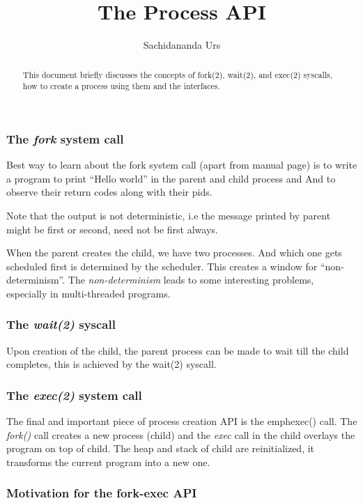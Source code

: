 \documentclass[11pt]{article}
\title{The Process API}
\author{Sachidananda Urs}
\begin{document}
\maketitle

\begin{abstract}
  This document briefly discusses the concepts of fork(2), wait(2), and
  exec(2) syscalls, how to create a process using them and the interfaces.
\end{abstract}

\subsubsection*{The \emph{fork} system call}
Best way to learn about the fork system call (apart from manual page) is to
write a program to print ``Hello world'' in the parent and child process and And
to observe their return codes along with their pids.

Note that the output is not deterministic, i.e the message printed by parent
might be first or second, need not be first always.

When the parent creates the child, we have two processes. And which one gets
scheduled first is determined by the scheduler. This creates a window for
``non-determinism''. The \emph{non-determinism} leads to some interesting
problems, especially in multi-threaded programs.

\subsubsection*{The \emph{wait(2)} syscall}
Upon creation of the child, the parent process can be made to wait till the
child completes, this is achieved by the wait(2) syscall.

\subsubsection*{The \emph{exec(2)} system call}
The final and important piece of process creation API is the emph{exec()}
call. The \emph{fork()} call creates a new process (child) and the \emph{exec}
call in the child overlays the program on top of child. The heap and stack of
child are reinitialized, it transforms the current program into a new one.

\subsubsection*{Motivation for the fork-exec API}
\end{document}
